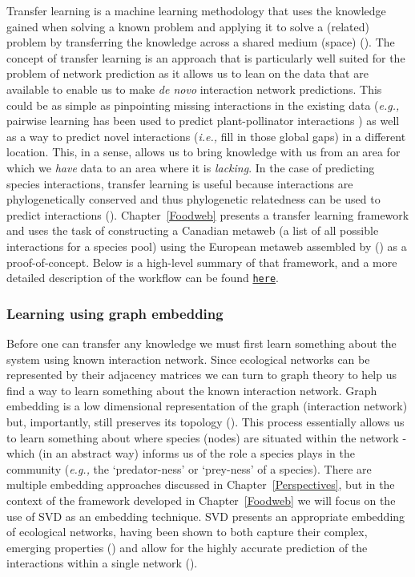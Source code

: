 \begin{refsection}
Transfer learning is a machine learning methodology that uses the 
knowledge gained when solving a known problem and
applying it to solve a (related) problem by transferring the knowledge
across a shared medium (space) (\cite{Torrey2010Transfer, Pan2010Survey}).
The concept of transfer learning is an approach that is particularly well suited for the problem of network
prediction as it allows us to lean on the data that are available to 
enable us to make \emph{de novo} interaction network predictions. This could be as simple as pinpointing missing interactions in the existing data 
(\emph{e.g.,} pairwise learning has been used to predict plant-pollinator
interactions \cite{Stock2021Pairwise}) as well as a way to predict
novel interactions (\emph{i.e.,} fill in those global gaps) in a different location. This, in a sense, allows us to bring knowledge with us from an area for which we \emph{have} data to an area where it is \emph{lacking}. In the case of predicting species interactions, transfer learning is useful because interactions are phylogenetically conserved and thus phylogenetic relatedness can be used to predict interactions (\cite{Davies2021EcoRed, Elmasri2020HieBay, Gomez2010EcoInt}). Chapter~\ref{Foodweb} presents a transfer learning framework and uses the task of constructing a Canadian metaweb (a list of all possible interactions for a species pool) using the European metaweb assembled by (\cite{Maiorano2020Tetraeu}) as a proof-of-concept. Below is a high-level summary of that framework, and a more detailed description of the workflow can be found \href{https://osf.io/2zwqm/}{\texttt{here}}.

\subsubsection{Learning using graph embedding}\label{learning-using-embedding}

Before one can transfer any knowledge we must first learn something about the system using known interaction network. Since ecological networks can be represented by their adjacency matrices we can turn to graph theory to help us find a way to learn something about the known interaction network. Graph embedding is a low dimensional representation of the graph (interaction network) but, importantly, still preserves its topology (\cite{Yan2005Graph}). This process essentially allows us to learn something about where species (nodes) are situated within the network - which (in an abstract way) informs us of the role a species plays in the community (\emph{e.g.,} the `predator-ness' or `prey-ness' of a species). There are multiple embedding approaches discussed in Chapter~\ref{Perspectives}, but in the context of the framework developed in Chapter~\ref{Foodweb} we will focus on the use of SVD as an embedding technique. SVD presents an appropriate embedding of ecological networks, having been shown to both capture their complex, emerging properties (\cite{Strydom2021SvdEnt}) and allow for the highly accurate prediction of the interactions within a single network (\cite{Poisot2021ImpMam}).


\end{refsection}
